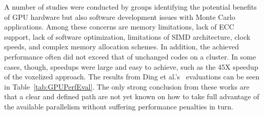 A number of studies were conducted by groups identifying the potential benefits of GPU hardware but also software development issues with Monte Carlo applications. 
%
Among these concerns are memory limitations, lack of ECC support, lack of software optimization, limitations of SIMD architecture, clock speeds, and complex memory allocation schemes.
%
In addition, the achieved performance often did not exceed that of unchanged codes on a cluster.
%
In some cases, though, speedups were large and easy to achieve, such as the 45X speedup of the voxelized approach. 
%
The results from Ding et al.'s~\cite{ding2011evaluation} evaluations can be seen in Table~\ref{tab:GPUPerfEval}.
%
The only strong conclusion from these works are that a clear and defined path are not yet known on how to take full advantage of the available parallelism without suffering performance penalties in turn.
